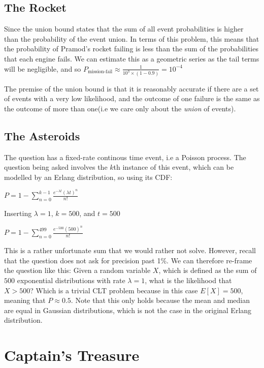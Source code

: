 \documentclass{exam}
\begin{document}
\subsection{The Rocket}
Since the union bound states that the sum of all event probabilities is higher than the probability of the event union. In terms of this problem, this means that the probability of Pramod's rocket failing is less than the sum of the probabilities that each engine fails. We can estimate this as a geometric series as the tail terms will be negligible, and so $P_{\text{mission-fail}} \approx \frac{1}{10^3 \times (1-0.9)} = 10^{-4}$

The premise of the union bound is that it is reasonably accurate if there are a set of events with a very low likelihood, and the outcome of one failure is the same as the outcome of more than one(i.e we care only about the \textit{union} of events). %

\subsection{The Asteroids}
The question has a fixed-rate continous time event, i.e a Poisson process. The question being asked involves the $k$th instance of this event, which can be modelled by an Erlang distribution, so using its CDF:

$P = 1 - \sum_{n=0}^{k-1} \frac{e^{-\lambda t}(\lambda t)^n}{n!}$

Inserting $\lambda = 1$, $k=500$, and $t=500$

$P = 1 - \sum_{n=0}^{499} \frac{e^{-500}(500)^n}{n!}$

This is a rather unfortunate sum that we would rather not solve. However, recall that the question does not ask for precision past 1\%. We can therefore re-frame the question like this:
\newline
\newline
Given a random variable $X$, which is defined as the sum of $500$ exponential distributions with rate $\lambda=1$, what is the likelihood that $X>500$?
\newline
\newline
Which is a trivial CLT problem because in this case $E[X] = 500$, meaning that $P \approx 0.5$. Note that this only holds because the mean and median are equal in Gaussian distributions, which is not the case in the original Erlang distribution. 

\section{Captain's Treasure}
\end{document}
